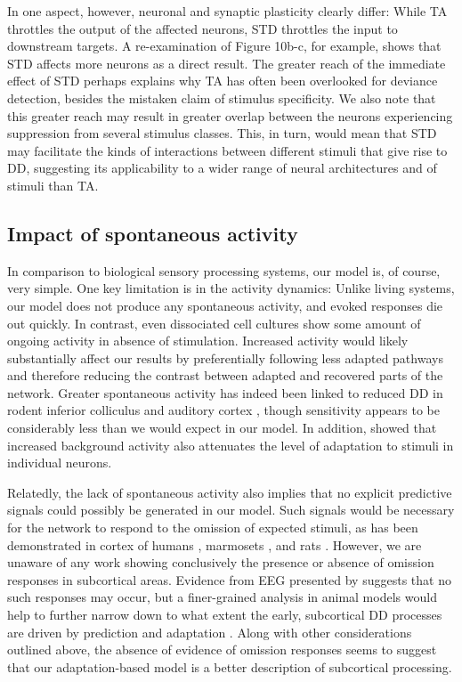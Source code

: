 \documentclass[9pt,lineno,onehalfspacing]{elife}
\begin{document}
In one aspect, however, neuronal and synaptic plasticity clearly differ: While TA throttles the output of the affected neurons, STD throttles the input to downstream targets. A re-examination of Figure 10b-c, for example, shows that STD affects more neurons as a direct result. The greater reach of the immediate effect of STD perhaps explains why TA has often been overlooked for deviance detection, besides the mistaken claim of stimulus specificity. We also note that this greater reach may result in greater overlap between the neurons experiencing suppression from several stimulus classes. This, in turn, would mean that STD may facilitate the kinds of interactions between different stimuli that give rise to DD, suggesting its applicability to a wider range of neural architectures and of stimuli than TA.

\subsection{Impact of spontaneous activity}

In comparison to biological sensory processing systems, our model is, of course, very simple. One key limitation is in the activity dynamics: Unlike living systems, our model does not produce any spontaneous activity, and evoked responses die out quickly. In contrast, even dissociated cell cultures show some amount of ongoing activity in absence of stimulation. Increased activity would likely substantially affect our results by preferentially following less adapted pathways and therefore reducing the contrast between adapted and recovered parts of the network. Greater spontaneous activity has indeed been linked to reduced DD in rodent inferior colliculus \citep{Duque2012-vx, Duque2015-eu} and auditory cortex \citep{Klein2014-op}, though sensitivity appears to be considerably less than we would expect in our model. In addition, \cite{Abolafia2011-ig} showed that increased background activity also attenuates the level of adaptation to stimuli in individual neurons.

Relatedly, the lack of spontaneous activity also implies that no explicit predictive signals could possibly be generated in our model. Such signals would be necessary for the network to respond to the omission of expected stimuli, as has been demonstrated in cortex of humans \citep{Lehmann2016-ol, Demarchi2019-ch}, marmosets \citep{Jiang2022-ak}, and rats \citep{Auksztulewicz2022-gq}. However, we are unaware of any work showing conclusively the presence or absence of omission responses in subcortical areas. Evidence from EEG presented by \cite{Lehmann2016-ol} suggests that no such responses may occur, but a finer-grained analysis in animal models would help to further narrow down to what extent the early, subcortical DD processes are driven by prediction and adaptation \citep{Schlossmacher2022-zv}. Along with other considerations outlined above, the absence of evidence of omission responses seems to suggest that our adaptation-based model is a better description of subcortical processing.
\end{document}
